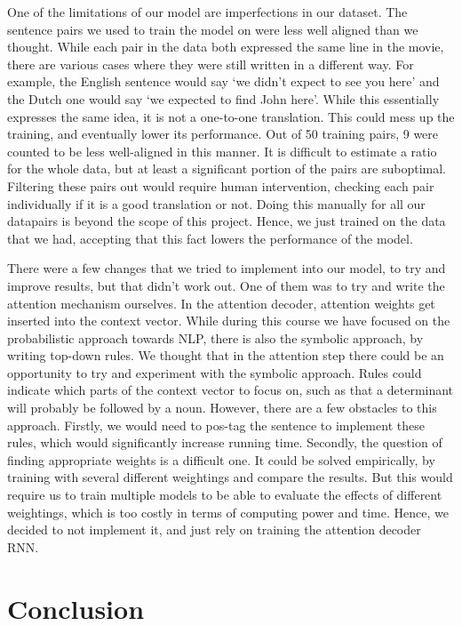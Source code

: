 \documentclass[11pt]{article}
\begin{document}
One of the limitations of our model are imperfections in our dataset. The sentence pairs we used to train the model on were less well aligned than we thought. While each pair in the data both expressed the same line in the movie, there are various cases where they were still written in a different way. For example, the English sentence would say ‘we didn’t expect to see you here’ and the Dutch one would say ‘we expected to find John here’. While this essentially expresses the same idea, it is not a one-to-one translation. This could mess up the training, and eventually lower its performance. Out of 50 training pairs, 9 were counted to be less well-aligned in this manner. It is difficult to estimate a ratio for the whole data, but at least a significant portion of the pairs are suboptimal. Filtering these pairs out would require human intervention, checking each pair individually if it is a good translation or not. Doing this manually for all our datapairs is beyond the scope of this project. Hence, we just trained on the data that we had, accepting that this fact lowers the performance of the model.

There were a few changes that we tried to implement into our model, to try and improve results, but that didn’t work out. One of them was to try and write the attention mechanism ourselves. In the attention decoder, attention weights get inserted into the context vector. While during this course we have focused on the probabilistic approach towards NLP, there is also the symbolic approach, by writing top-down rules. We thought that in the attention step there could be an opportunity to try and experiment with the symbolic approach. Rules could indicate which parts of the context vector to focus on, such as that a determinant will probably be followed by a noun. However, there are a few obstacles to this approach. Firstly, we would need to pos-tag the sentence to implement these rules, which would significantly increase running time. Secondly, the question of finding appropriate weights is a difficult one. It could be solved empirically, by training with several different weightings and compare the results. But this would require us to train multiple models to be able to evaluate the effects of different weightings, which is too costly in terms of computing power and time. Hence, we decided to not implement it, and just rely on training the attention decoder RNN.

\section{Conclusion}
\end{document}
